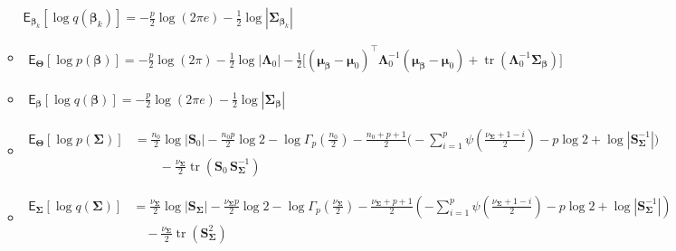 \begin{itemize}
\begin{itemize}
    $
    \mathsf{E}_{\bm{\beta}_k}\left[\log q(\bm{\beta}_k)\right]=-\tfrac{p}{2}\log(2\pi e)-\tfrac{1}{2}\log|\bm{\Sigma}_{\bm{\beta}_k}|
    $

        \item 

    $
    \begin{aligned}
        \mathsf{E}_{\bm{\Theta}}\left[\log p(\bm{\beta})\right]=-\tfrac{p}{2}\log(2\pi)-\tfrac{1}{2}\log|\bm{\Lambda}_0|
-\tfrac{1}{2}\Big[
(\bm{\mu}_{\bm{\beta}}-\bm{\mu}_0)^\top\bm{\Lambda}_0^{-1}(\bm{\mu}_{\bm{\beta}}-\bm{\mu}_0)
+\operatorname{tr}\!\!\left(\bm{\Lambda}_0^{-1}\bm{\Sigma}_{\bm{\beta}}\right)
\Big]
    \end{aligned}
    $

        \item 

    $
    \begin{aligned}
        \mathsf{E}_{\bm{\beta}}\left[\log q(\bm{\beta})\right]=-\tfrac{p}{2}\log(2\pi e)-\tfrac{1}{2}\log|\bm{\Sigma}_{\bm{\beta}}|
    \end{aligned}
    $

            \item 

    $
    \begin{aligned}
\mathsf{E}_{\bm{\Theta}}\left[\log p(\bm{\Sigma})\right] &=
\tfrac{n_0}{2}\log|\bm{S}_0|-\tfrac{n_0 p}{2}\log 2-\log\Gamma_p\!\!\left(\tfrac{n_0}{2}\right)
-\tfrac{n_0+p+1}{2}\Bigg(
-\sum_{i=1}^{p}\psi\!\!\left(\tfrac{\nu_{\bm{\Sigma}}+1-i}{2}\right)-p\log 2+\log|\bm{S}_{\bm{\Sigma}}^{-1}|
\Bigg) \\
&\qquad
-\tfrac{\nu_{\bm{\Sigma}}}{2}\operatorname{tr}\left(\bm{S}_0\,\bm{S}_{\bm{\Sigma}}^{-1}\right)
    \end{aligned}
    $

        \item 

    $
    \begin{aligned}
        \mathsf{E}_{\bm{\Sigma}}\left[\log q(\bm{\Sigma})\right]&=\tfrac{\nu_{\bm{\Sigma}}}{2}\log|\mathbf{S}_{\bm{\Sigma}}|
- \tfrac{\nu_{\bm{\Sigma}} p}{2}\log 2
- \log\Gamma_p\left(\tfrac{\nu_{\bm{\Sigma}}}{2}\right) - \tfrac{\nu_{\bm{\Sigma}}+p+1}{2}\left(
-\sum_{i=1}^{p}\psi\left(\tfrac{\nu_{\bm{\Sigma}}+1-i}{2}\right)-p\log 2+\log|\mathbf{S}_{\bm{\Sigma}}^{-1}|
\right) \\ 
&\quad - \tfrac{\nu_{\bm{\Sigma}}}{2}\operatorname{tr}\left(\mathbf{S}_{\bm{\Sigma}}^2\right)
    \end{aligned}
    $


\end{itemize}
\end{itemize}
